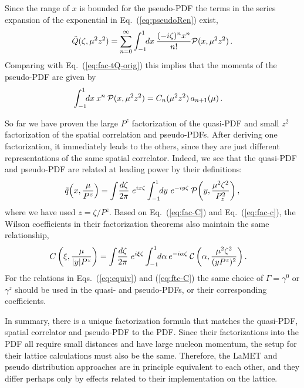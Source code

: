 \documentclass[prd,aps,twocolumn,preprintnumbers,showpacs,nofootinbib,superscriptaddress,notitlepage]{revtex4-1}
\newcommand{\beq}{\begin{eqnarray}}
\newcommand{\eeq}{\end{eqnarray}}
\newcommand{\nn}{\nonumber}
\newcommand{\spcorr}{spatial correlator\xspace}
\DeclareRobustCommand{\eq}[1]{Eq.~(\ref{eq:#1})}
\DeclareRobustCommand{\eqs}[2]{Eqs.~(\ref{eq:#1}) and (\ref{eq:#2})}
\begin{document}
Since the range of $x$ is bounded for the pseudo-PDF the terms in the series expansion of the exponential in \eq{pseudoRen} exist,
\begin{align}
  \tilde Q(\zeta,\mu^2 z^2)
   = \sum_{n=0}^\infty \int_{-1}^{1}\!\! dx\: \frac{(-i\zeta)^n x^n}{n!}
     {\cal P}(x,\mu^2 z^2) \,.
\end{align}
Comparing with \eq{fac-tQ-orig} this implies that the moments of the pseudo-PDF are given by
\begin{align}  \label{eq:Pmoment}
  \int_{-1}^{1}\!\! dx\: x^n \:  {\cal P}(x,\mu^2 z^2)
  &= C_n(\mu^2 z^2)\, a_{n+1}(\mu) \,.
\end{align}

So far we have proven the large $P^z$ factorization of the quasi-PDF and small $z^2$ factorization of the spatial correlation and pseudo-PDFs. After
deriving one factorization, it immediately leads to the others, since they are just different representations of the same spatial correlator. Indeed, we see that the quasi-PDF and pseudo-PDF are related at leading power by their definitions:
\beq \label{eq:equiv}
\tilde{q}\Bigl(x,{\mu\over P^z}\Bigr)
  = \int\! {d\zeta\over 2\pi}\ e^{ix\zeta}\int_{-1}^1\!\! dy \ e^{-iy\zeta}
  \: \mathcal{P}\biggl(y,{\mu^2 \zeta^2\over P_z^2}\biggr)\,,\nn\\
\eeq
where we have used $z=\zeta/P^z$.
Based on Eq.~(\ref{eq:fac-C}) and Eq.~(\ref{eq:fac-c}), the Wilson coefficients in their factorization theorems also maintain the same relationship,
\begin{align} \label{eq:ftc-C}
 C\left(\xi,{\mu\over |y|P^z}\right)
  &= \int\! {d\zeta\over 2\pi}\ e^{i\xi\zeta}\int_{-1}^1\!\! d\alpha\: e^{-i\alpha\zeta}\: \mathcal{C}\left(\alpha,{\mu^2 \zeta^2\over (yP^z)^2}\right) .
\end{align}
For the relations in \eqs{equiv}{ftc-C} the same choice of $\Gamma=\gamma^0$ or $\gamma^z$ should be used in the quasi- and pseudo-PDFs, or their corresponding coefficients.

In summary, there is a unique factorization formula that matches the quasi-PDF, \spcorr and pseudo-PDF to the PDF. Since their factorizations into the PDF all require small distances and have large nucleon momentum, the setup for their lattice calculations must also be the same. Therefore, the LaMET and pseudo distribution approaches are in principle equivalent to each other, and they differ perhaps only by effects related to their implementation on the lattice.
\end{document}
